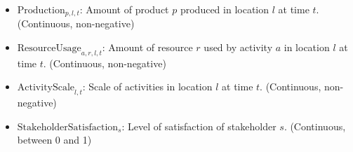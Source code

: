 \documentclass{article}
\begin{document}
\begin{itemize}
    \item $\text{Production}_{p,l,t}$: Amount of product $p$ produced in location $l$ at time $t$. (Continuous, non-negative)
    \item $\text{ResourceUsage}_{a,r,l,t}$: Amount of resource $r$ used by activity $a$ in location $l$ at time $t$. (Continuous, non-negative)
    \item $\text{ActivityScale}_{l,t}$:  Scale of activities in location $l$ at time $t$.  (Continuous, non-negative)
    \item $\text{StakeholderSatisfaction}_s$: Level of satisfaction of stakeholder $s$. (Continuous, between 0 and 1)
\end{itemize}
\end{document}
